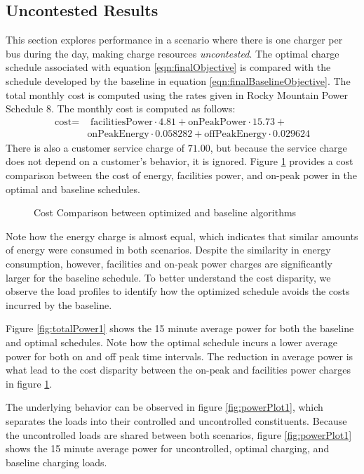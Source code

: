 \subsection{Uncontested Results}
	This section explores performance in a scenario where there is one charger per bus during the day, making charge resources \textit{uncontested}. The optimal charge schedule associated with equation \ref{eqn:finalObjective} is compared with the schedule developed by the baseline in equation \ref{eqn:finalBaselineObjective}. The total monthly cost is computed using the rates given in Rocky Mountain Power Schedule 8. The monthly cost is computed as follows:
	\begin{equation}
		\begin{aligned}
			\text{cost} = & \text{ facilitiesPower}\cdot 4.81 + \text{onPeakPower}\cdot 15.73 + \\ 
			& \text{onPeakEnergy}\cdot 0.058282 + \text{offPeakEnergy}\cdot 0.029624
		\end{aligned}
	\end{equation}
There is also a customer service charge of $71.00$, but because the service charge does not depend on a customer's behavior, it is ignored. Figure \ref{fig:costComparison} provides a cost comparison between the cost of energy, facilities power, and on-peak power in the optimal and baseline schedules.
\begin{figure}
	\centering
	\caption{Cost Comparison between optimized and baseline algorithms}
	\label{fig:costComparison}
\end{figure}
\par Note how the energy charge is almost equal, which indicates that similar amounts of energy were consumed in both scenarios. Despite the similarity in energy consumption, however, facilities and on-peak power charges are significantly larger for the baseline schedule. To better understand the cost disparity, we observe the load profiles to identify how the optimized schedule avoids the costs incurred by the baseline.
	\par Figure \ref{fig:totalPower1} shows the 15 minute average power for both the baseline and optimal schedules. Note how the optimal schedule incurs a lower average power for both on and off peak time intervals. The reduction in average power is what lead to the cost disparity between the on-peak and facilities power charges in figure \ref{fig:costComparison}. 
	\par The underlying behavior can be observed in figure \ref{fig:powerPlot1}, which separates the loads into their controlled and uncontrolled constituents. Because the uncontrolled loads are shared between both scenarios, figure \ref{fig:powerPlot1} shows the 15 minute average power for uncontrolled, optimal charging, and baseline charging loads. 
